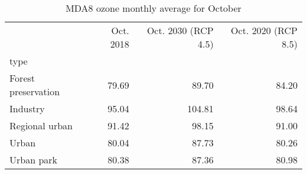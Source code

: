 \begin{table}
\centering
\caption{MDA8 ozone monthly average for October}
\label{o3_oct_type}
\begin{tabular}{lrrr}
\toprule
{} &  Oct. 2018 &  Oct. 2030 (RCP 4.5) &  Oct. 2020 (RCP 8.5) \\
type                &            &                      &                      \\
\midrule
Forest preservation &      79.69 &                89.70 &                84.20 \\
Industry            &      95.04 &               104.81 &                98.64 \\
Regional urban      &      91.42 &                98.15 &                91.00 \\
Urban               &      80.04 &                87.73 &                80.26 \\
Urban park          &      80.38 &                87.36 &                80.98 \\
\bottomrule
\end{tabular}
\end{table}

